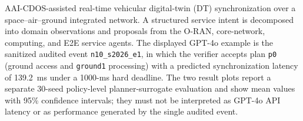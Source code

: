 \caption{AAI-CDOS-assisted real-time vehicular digital-twin (DT) synchronization over a space--air--ground integrated network. A structured service intent is decomposed into domain observations and proposals from the O-RAN, core-network, computing, and E2E service agents. The displayed GPT-4o example is the sanitized audited event \texttt{n10\_s2026\_e1}, in which the verifier accepts plan \texttt{p0} (ground access and \texttt{ground1} processing) with a predicted synchronization latency of 139.2~ms under a 1000-ms hard deadline. The two result plots report a separate 30-seed policy-level planner-surrogate evaluation and show mean values with 95\% confidence intervals; they must not be interpreted as GPT-4o API latency or as performance generated by the single audited event.}

